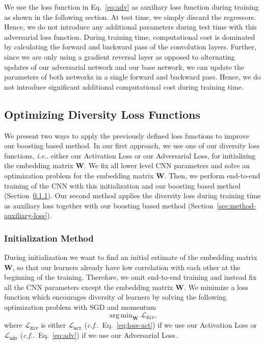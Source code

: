 \documentclass[10pt,journal,compsoc]{IEEEtran}
\makeatletter
\DeclareMathOperator*{\argmin}{arg\,min}
\DeclareRobustCommand\onedot{\futurelet\@let@token\@onedot}
\def\@onedot{\ifx\@let@token.\else.\null\fi\xspace}
\def\ie{\emph{i.e}\onedot} \def\Ie{\emph{I.e}\onedot}
\def\cf{\emph{c.f}\onedot} \def\Cf{\emph{C.f}\onedot}
\makeatother
\begin{document}
We use the loss function in Eq.~\eqref{eq:adv} as auxiliary loss function
during training as shown in the following section. At test time, we simply discard the regressors.  Hence, we do
not introduce any additional parameters during test time with this adversarial
loss function. During training time, computational cost is dominated by calculating
the forward and backward pass of the convolution layers. Further, since we are only using
a gradient reversal layer as opposed to alternating updates of our adversarial network
and our base network, we can update the parameters of both networks in a single forward and backward pass.
Hence, we do not introduce significant additional computational cost during training time.

\subsection{Optimizing Diversity Loss Functions}\label{sec:optimizing-diversity}

We present two ways to apply the previously defined loss functions to
improve our boosting based method.
In our first approach, we use one of our diversity loss functions, \ie either our Activation Loss or our Adversarial Loss, for initializing the embedding matrix $\boldsymbol{W}$. We fix all lower level \ac{CNN} parameters 
and solve an optimization problem for the embedding matrix $\boldsymbol{W}$. 
Then, we perform end-to-end training of the \ac{CNN} with this initialization and
our boosting based method (Section~\ref{sec:initialization-method}).
Our second method applies the diversity loss during training time as auxiliary loss together with our 
boosting based method (Section~\ref{sec:method-auxiliary-loss}).

\subsubsection{Initialization Method}\label{sec:initialization-method}

During initialization we want to find an initial estimate of the embedding matrix $\boldsymbol{W}$, so that 
our learners already have low correlation with each other at the beginning of the training.
Therefore, we omit end-to-end training and instead fix all the \ac{CNN} parameters except the embedding
matrix $\boldsymbol{W}$. We minimize a loss function which encourages diversity of learners by solving 
the following optimization problem with \ac{SGD} and momentum
\begin{equation}
    \argmin_{\boldsymbol{W}} \mathcal{L_{\texttt{div}}},
\end{equation}
where $\mathcal{L_{\texttt{div}}}$ is either $\mathcal{L_{\texttt{act}}}$ (\cf~Eq.~\eqref{eq:loss-act}) if we 
use our Activation Loss or $\mathcal{L_{\texttt{adv}}}$ (\cf~Eq.~\eqref{eq:adv}) if we use our Adversarial Loss.
\end{document}
